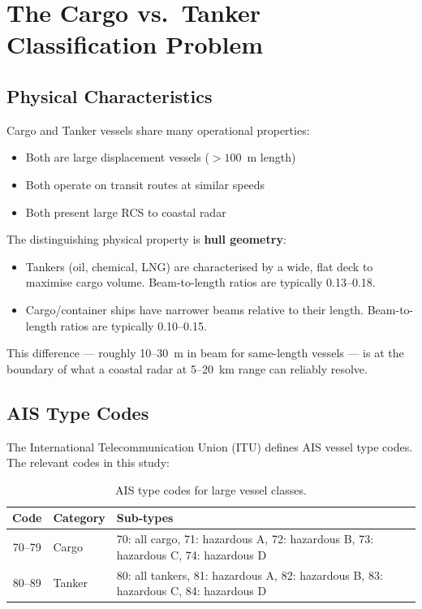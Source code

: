 \documentclass[journal]{IEEEtran}
\begin{document}
\section{The Cargo vs.\ Tanker Classification Problem}
\label{sec:problem}

\subsection{Physical Characteristics}

Cargo and Tanker vessels share many operational properties:
\begin{itemize}
  \item Both are large displacement vessels ($>100$~m length)
  \item Both operate on transit routes at similar speeds
  \item Both present large RCS to coastal radar
\end{itemize}

The distinguishing physical property is \textbf{hull geometry}:
\begin{itemize}
  \item Tankers (oil, chemical, LNG) are characterised by a wide, flat deck
        to maximise cargo volume. Beam-to-length ratios are typically 0.13--0.18.
  \item Cargo/container ships have narrower beams relative to their length.
        Beam-to-length ratios are typically 0.10--0.15.
\end{itemize}

This difference — roughly 10--30~m in beam for same-length vessels — is at the
boundary of what a coastal radar at 5--20~km range can reliably resolve.

\subsection{AIS Type Codes}

The International Telecommunication Union (ITU) defines AIS vessel type codes.
The relevant codes in this study:

\begin{table}[H]
\centering
\caption{AIS type codes for large vessel classes.}
\begin{tabular}{clp{7cm}}
\toprule
\textbf{Code} & \textbf{Category} & \textbf{Sub-types} \\
\midrule
70--79 & Cargo       & 70: all cargo, 71: hazardous A, 72: hazardous B, 73: hazardous C, 74: hazardous D \\
80--89 & Tanker      & 80: all tankers, 81: hazardous A, 82: hazardous B, 83: hazardous C, 84: hazardous D \\
\bottomrule
\end{tabular}
\end{table}
\end{document}
